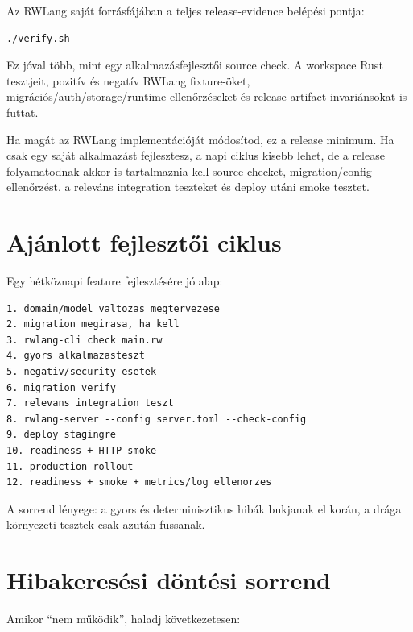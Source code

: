 Az RWLang saját forrásfájában a teljes release-evidence belépési pontja:

\begin{lstlisting}
./verify.sh
\end{lstlisting}

Ez jóval több, mint egy alkalmazásfejlesztői source check. A workspace Rust tesztjeit, pozitív és negatív RWLang fixture-öket, migrációs/auth/storage/runtime ellenőrzéseket és release artifact invariánsokat is futtat.

Ha magát az RWLang implementációját módosítod, ez a release minimum. Ha csak egy saját  alkalmazást fejlesztesz, a napi ciklus kisebb lehet, de a release folyamatodnak akkor is tartalmaznia kell source checket, migration/config ellenőrzést, a releváns integration teszteket és deploy utáni smoke tesztet.

\section{Ajánlott fejlesztői ciklus}

Egy hétköznapi feature fejlesztésére jó alap:

\begin{lstlisting}
1. domain/model valtozas megtervezese
2. migration megirasa, ha kell
3. rwlang-cli check main.rw
4. gyors alkalmazasteszt
5. negativ/security esetek
6. migration verify
7. relevans integration teszt
8. rwlang-server --config server.toml --check-config
9. deploy stagingre
10. readiness + HTTP smoke
11. production rollout
12. readiness + smoke + metrics/log ellenorzes
\end{lstlisting}

A sorrend lényege: a gyors és determinisztikus hibák bukjanak el korán, a drága környezeti tesztek csak azután fussanak.

\section{Hibakeresési döntési sorrend}

Amikor ``nem működik'', haladj következetesen:

